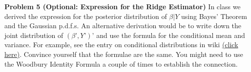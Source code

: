 \documentclass[11pt]{article} %
\begin{document}
\noindent \textbf{Problem 5 (Optional: Expression for the Ridge Estimator) } In class we derived the expression for the posterior distribution of $\beta | Y$ using Bayes’ Theorem and the Gaussian p.d.f.s. An alternative derivation would be to write down the joint distribution of $(\beta’, Y’)’$ and use the formula for the conditional mean and variance. For example, see the entry on conditional distributions in wiki \href{https://en.wikipedia.org/wiki/Multivariate_normal_distribution#Conditional_distributions}{(click here)}.  Convince yourself that the formulae are the same. You might need to use the Woodbury Identity Formula a couple of times to establish the connection. 



\end{document}
